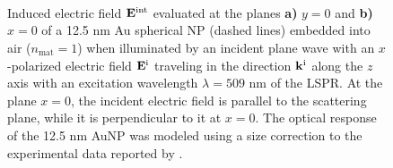 \begin{figure}  \centering
	\def\svgwidth{\textwidth} \small
		\vspace*{4.em}
		\hspace*{-.5\textwidth}
	\begin{subfigure}{.525\textwidth}\caption{ } \label{fig:NearField:par}\end{subfigure}%
	\begin{subfigure}{.49\textwidth}\caption{ }\label{fig:NearField:perp}\end{subfigure}%
	\vspace*{-7.em}\\
	\\
    \def\svgwidth{\textwidth}
        \hspace*{-.5\textwidth}
    \begin{subfigure}{.525\textwidth}\caption{ } \label{fig:NearField:par}\end{subfigure}%
    \begin{subfigure}{.49\textwidth}\caption{ }\label{fig:NearField:perp}\end{subfigure}
        \vspace*{-1.75em}\\
	\vspace*{-2em}
	\caption[Induced Electric Field of a 12.5 nm Au Spherical NP Embedded into Air at the LSPR]{Induced electric field $\vb{E}^\text{int}$ evaluated at the planes \textbf{a)} $y = 0$ and \textbf{b)} $x = 0$  of a 12.5 nm Au spherical NP (dashed lines) embedded into air ($n_\text{mat} = 1$) when illuminated by an incident plane wave with an $x$-polarized electric field $\vb{E}^\text{i}$ traveling in the direction $\vb{k}^\text{i}$ along the $z$ axis with an	 excitation wavelength $\lambda = 509$ nm of the LSPR. At the plane $x = 0$, the incident electric field is parallel to the scattering plane, while it is perpendicular to it at $x = 0$. The optical response of the 12.5 nm AuNP was modeled using a size correction to the experimental data reported by \citeauthor{johnson_optical_1972} \cite{johnson_optical_1972}.}
	\label{fig:NearField}
 \end{figure}

